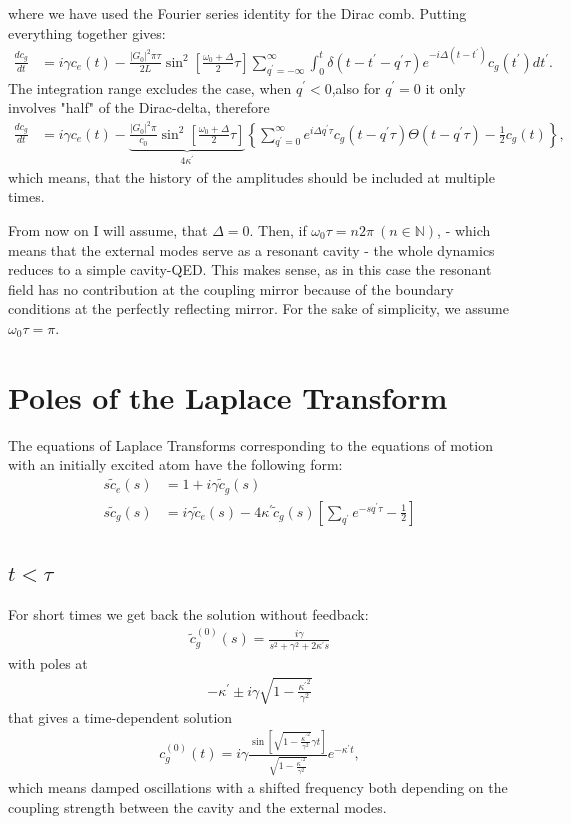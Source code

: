 \documentclass[11pt, a4paper]{article}
\def\qp{{q^\prime}}
\def\tp{{t^\prime}}
\def\kappap{{\kappa^\prime}}
\def\ctil{\tilde{c}}
\def\nn{\nonumber}
\newcommand{\lsz}{\left[}
\newcommand{\rsz}{\right]}
\newcommand{\lk}{\left(}
\newcommand{\rk}{\right)}
\newcommand{\lka}{\left\{}
\newcommand{\rka}{\right\}}
\begin{document}
where we have used the Fourier series identity for the Dirac comb. Putting everything together gives:
\begin{align}
\frac{dc_g}{dt} &= i\gamma c_e(t) - \frac{|G_0|^2\pi\tau}{2L}\sin^2{\lsz\frac{\omega_0+\Delta}{2}\tau\rsz}\sum_{\qp=-\infty}^{\infty}\int_0^t\delta\lk t-\tp-\qp\tau\rk e^{-i\Delta(t-\tp)} c_{g}(\tp)d\tp.\nn
\end{align}
The integration range excludes the case, when $\qp<0$,also for $\qp=0$ it only involves "half" of the Dirac-delta, therefore
\begin{align}
\frac{dc_g}{dt} &= i\gamma c_e(t) - \underbrace{\frac{|G_0|^2\pi}{c_0}\sin^2{\lsz\frac{\omega_0+\Delta}{2}\tau\rsz}}_{4\kappap}\lka\sum_{\qp=0}^{\infty}e^{i\Delta\qp\tau} c_{g}(t-\qp\tau)\Theta(t-\qp\tau)-\frac{1}{2}c_g(t)\rka,
\end{align}
which means, that the history of the amplitudes should be included at multiple times.

From now on I will assume, that $\Delta=0$. Then, if $\omega_0\tau=n 2\pi\ (n\in\mathbb{N})$, - which means that the external modes serve as a resonant cavity - the whole dynamics reduces to a simple cavity-QED. This makes sense, as in this case the resonant field has no contribution at the coupling mirror because of the boundary conditions at the perfectly reflecting mirror. For the sake of simplicity, we assume $\omega_0\tau=\pi$. 

\section{Poles of the Laplace Transform}
The equations of Laplace Transforms corresponding to the equations of motion with an initially excited atom have the following form:
\begin{align}
\label{eq:lap_ce}
s\ctil_e(s) &= 1+i\gamma\ctil_g(s)\\
\label{eq:lap_cg}
s\ctil_g(s) &= i\gamma\ctil_e(s) - 4\kappap\ctil_g(s)\lsz\sum_\qp e^{-s\qp\tau}-\frac{1}{2}\rsz
\end{align}

\subsection{$t<\tau$}
For short times we get back the solution without feedback:
\begin{align}
\ctil_g^{(0)}(s) = \frac{i\gamma}{s^2+\gamma^2+2\kappap s}
\end{align}
with poles at 
\begin{align}
-\kappap\pm i\gamma\sqrt{1-\frac{\kappap^2}{\gamma^2}}
\end{align}
that gives a time-dependent solution
\begin{align}
c_g^{(0)}(t) = i\gamma\frac{\sin{\lsz\sqrt{1-\frac{\kappap^2}{\gamma^2}}\gamma t\rsz}}{\sqrt{1-\frac{\kappap^2}{\gamma^2}}}e^{-\kappap t},
\end{align}
which means damped oscillations with a shifted frequency both depending on the coupling strength between the cavity and the external modes.
\end{document}
